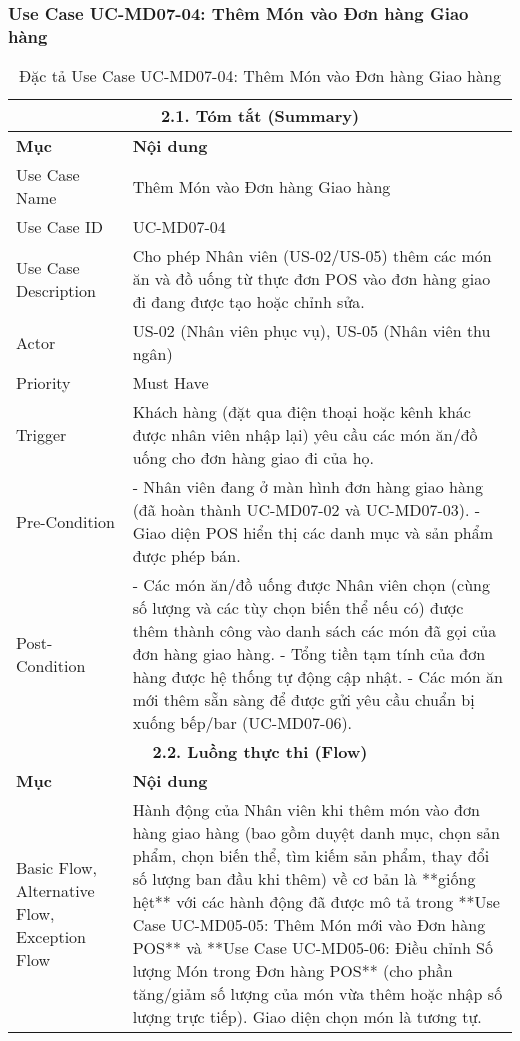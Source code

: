 \begin{longtable}{|m{4cm}|p{11cm}|}
\hline
\end{longtable}

\subsubsection{Use Case UC-MD07-04: Thêm Món vào Đơn hàng Giao hàng}
\begin{longtable}{|m{4cm}|p{11cm}|}
\caption{Đặc tả Use Case UC-MD07-04: Thêm Món vào Đơn hàng Giao hàng} \label{tab:uc_md07_04_final_full} \\
\hline
\multicolumn{2}{|c|}{\textbf{2.1. Tóm tắt (Summary)}} \\
\hline
\textbf{Mục} & \textbf{Nội dung} \\
\hline
\endhead %
\hline
\endfoot %
\hline
\endlastfoot %
Use Case Name & Thêm Món vào Đơn hàng Giao hàng \\
\hline
Use Case ID & UC-MD07-04 \\
\hline
Use Case Description & Cho phép Nhân viên (US-02/US-05) thêm các món ăn và đồ uống từ thực đơn POS vào đơn hàng giao đi đang được tạo hoặc chỉnh sửa. \\
\hline
Actor & US-02 (Nhân viên phục vụ), US-05 (Nhân viên thu ngân) \\
\hline
Priority & Must Have \\
\hline
Trigger & Khách hàng (đặt qua điện thoại hoặc kênh khác được nhân viên nhập lại) yêu cầu các món ăn/đồ uống cho đơn hàng giao đi của họ. \\
\hline
Pre-Condition & - Nhân viên đang ở màn hình đơn hàng giao hàng (đã hoàn thành UC-MD07-02 và UC-MD07-03). \newline - Giao diện POS hiển thị các danh mục và sản phẩm được phép bán. \\
\hline
Post-Condition & - Các món ăn/đồ uống được Nhân viên chọn (cùng số lượng và các tùy chọn biến thể nếu có) được thêm thành công vào danh sách các món đã gọi của đơn hàng giao hàng. \newline - Tổng tiền tạm tính của đơn hàng được hệ thống tự động cập nhật. \newline - Các món ăn mới thêm sẵn sàng để được gửi yêu cầu chuẩn bị xuống bếp/bar (UC-MD07-06). \\
\hline
\multicolumn{2}{|c|}{\textbf{2.2. Luồng thực thi (Flow)}} \\
\hline
\textbf{Mục} & \textbf{Nội dung} \\
\hline
Basic Flow, Alternative Flow, Exception Flow & Hành động của Nhân viên khi thêm món vào đơn hàng giao hàng (bao gồm duyệt danh mục, chọn sản phẩm, chọn biến thể, tìm kiếm sản phẩm, thay đổi số lượng ban đầu khi thêm) về cơ bản là **giống hệt** với các hành động đã được mô tả trong **Use Case UC-MD05-05: Thêm Món mới vào Đơn hàng POS** và **Use Case UC-MD05-06: Điều chỉnh Số lượng Món trong Đơn hàng POS** (cho phần tăng/giảm số lượng của món vừa thêm hoặc nhập số lượng trực tiếp). Giao diện chọn món là tương tự. \\

\end{longtable}
